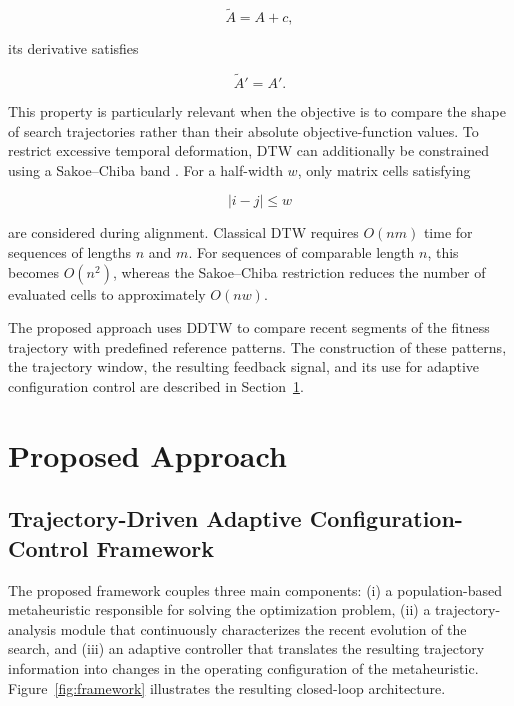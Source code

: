 \documentclass[journal,article,submit,moreauthors]{Definitions/mdpi}
\begin{document}
\begin{equation}
\widetilde{A}=A+c,
\end{equation}

its derivative satisfies

\begin{equation}
\widetilde{A}'=A'.
\end{equation}

This property is particularly relevant when the objective is to compare the
shape of search trajectories rather than their absolute objective-function
values. To restrict excessive temporal deformation, DTW can additionally be
constrained using a Sakoe--Chiba band \cite{sakoe1978dynamic}. For a
half-width $w$, only matrix cells satisfying

\begin{equation}
|i-j|\leq w
\end{equation}

\noindent are considered during alignment. Classical DTW requires $O(nm)$ time for
sequences of lengths $n$ and $m$. For sequences of comparable length $n$,
this becomes $O(n^2)$, whereas the Sakoe--Chiba restriction reduces the
number of evaluated cells to approximately $O(nw)$.

The proposed approach uses DDTW to compare recent segments of the fitness
trajectory with predefined reference patterns. The construction of these
patterns, the trajectory window, the resulting feedback signal, and its use
for adaptive configuration control are described in
Section~\ref{sec:proposed_approach}.



\section{Proposed Approach}
\label{sec:proposed_approach}

\subsection{Trajectory-Driven Adaptive Configuration-Control Framework}
\label{sec:framework_arch}

The proposed framework couples three main components: (i) a population-based
metaheuristic responsible for solving the optimization problem, (ii) a
trajectory-analysis module that continuously characterizes the recent
evolution of the search, and (iii) an adaptive controller that translates
the resulting trajectory information into changes in the operating
configuration of the metaheuristic. Figure~\ref{fig:framework} illustrates
the resulting closed-loop architecture.
\end{document}
